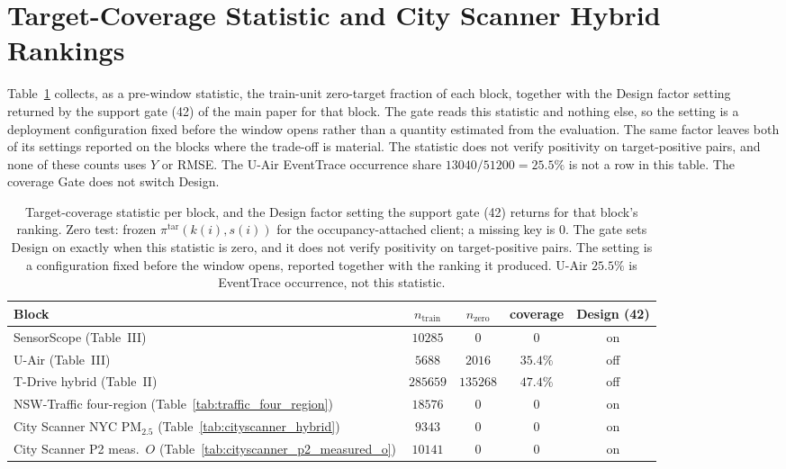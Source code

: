 \section{Target-Coverage Statistic and City Scanner Hybrid Rankings}
\label{app:cityscanner_phi}

Table~\ref{tab:scd_phi_freeze} collects, as a pre-window statistic, the
train-unit zero-target fraction of each block, together with the Design
factor setting returned by the support gate (42) of the main paper for that
block.  The gate reads this statistic and nothing else, so the setting is a
deployment configuration fixed before the window opens rather than a quantity
estimated from the evaluation.  The same factor leaves both of its settings
reported on the blocks where the trade-off is material.
The statistic does not verify positivity on
target-positive pairs, and none of these counts uses $Y$ or RMSE.
The U-Air EventTrace occurrence share
$13040/51200=25.5\%$ is not a row in this table.
The coverage Gate does not switch Design.

\begin{table}[t]
\centering
\caption{Target-coverage statistic per block, and the Design
factor setting the support gate (42) returns for that block's ranking.
Zero test: frozen $\pi^{\mathrm{tar}}(k(i),s(i))$ for the occupancy-attached
client; a missing key is $0$.
The gate sets Design on exactly when this statistic is zero, and it does not
verify positivity on target-positive pairs.
The setting is a configuration fixed before the window opens, reported together
with the ranking it produced.
U-Air $25.5\%$ is EventTrace occurrence, not this statistic.}
\label{tab:scd_phi_freeze}
\scriptsize
\setlength{\tabcolsep}{3pt}
\begin{tabular*}{\columnwidth}{@{\extracolsep{\fill}}lcccc}
\toprule
Block & $n_{\mathrm{train}}$ & $n_{\mathrm{zero}}$ & coverage & Design (42)\\
\midrule
SensorScope (Table~III) & $10285$ & $0$ & $0$ & on\\
U-Air (Table~III) & $5688$ & $2016$ & $35.4\%$ & off\\
T-Drive hybrid (Table~II) & $285659$ & $135268$ & $47.4\%$ & off\\
NSW-Traffic four-region (Table~\ref{tab:traffic_four_region}) & $18576$ & $0$ & $0$ & on\\
City Scanner NYC {PM}$_{2.5}$ (Table~\ref{tab:cityscanner_hybrid}) & $9343$ & $0$ & $0$ & on\\
City Scanner P2 meas.\ $O$ (Table~\ref{tab:cityscanner_p2_measured_o}) & $10141$ & $0$ & $0$ & on\\
\bottomrule
\end{tabular*}
\end{table}

